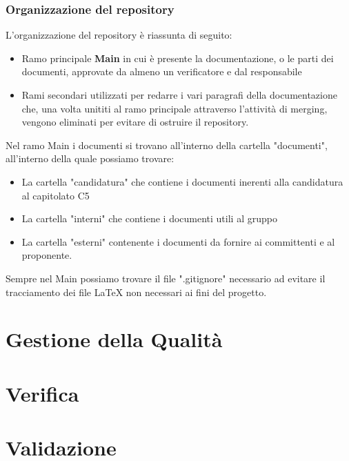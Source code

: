   \subsubsection{Organizzazione del repository}
  L'organizzazione del repository è riassunta di seguito:
  \begin{itemize}
      \item Ramo principale \textbf{Main} in cui è presente la documentazione, o le parti dei documenti, approvate da almeno un verificatore e dal responsabile
      \item Rami secondari utilizzati per redarre i vari paragrafi della documentazione che, una volta unititi al ramo principale attraverso l'attività di merging, vengono eliminati per evitare di ostruire il repository.
  \end{itemize}
  Nel ramo Main i documenti si trovano all'interno della cartella "documenti", all'interno della quale possiamo trovare:
  \begin{itemize}
      \item La cartella "candidatura" che contiene i documenti inerenti alla candidatura al capitolato C5
      \item La cartella "interni" che contiene i documenti utili al gruppo
      \item La cartella "esterni" contenente i documenti da fornire ai committenti e al proponente.
  \end{itemize}
  Sempre nel Main possiamo trovare il file ".gitignore" necessario ad evitare il tracciamento dei file \LaTeX{} non necessari ai fini del progetto.

 
  
\section{Gestione della Qualità}
\section{Verifica}
\section{Validazione}